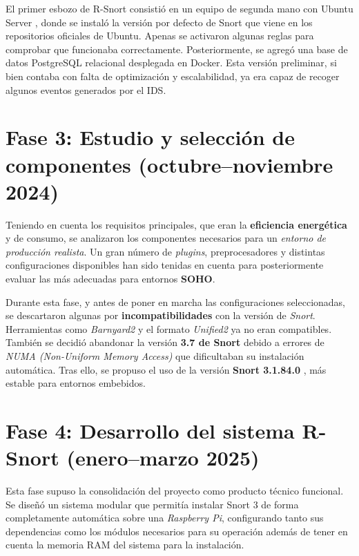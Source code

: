 \documentclass[11pt,a4paper,twoside]{report}
\begin{document}
El primer esbozo de R-Snort consistió en un equipo de segunda mano con Ubuntu Server \cite{insani2023implementation}, donde se instaló la versión por defecto de Snort que viene en los repositorios oficiales de Ubuntu. Apenas se activaron algunas reglas para comprobar que funcionaba correctamente. Posteriormente, se agregó una base de datos PostgreSQL relacional \cite{gkamas2022performance} desplegada en Docker. Esta versión preliminar, si bien contaba con falta de optimización y escalabilidad, ya era capaz de recoger algunos eventos generados por el IDS.

\section{Fase 3: Estudio y selección de componentes (octubre–noviembre 2024)}

Teniendo en cuenta los requisitos principales, que eran la \textbf{eficiencia energética} y de consumo, se analizaron los componentes necesarios para un \textit{entorno de producción realista}. Un gran número de \textit{plugins}, preprocesadores y distintas configuraciones disponibles han sido tenidas en cuenta para posteriormente evaluar las más adecuadas para entornos \textbf{SOHO}.\newline

Durante esta fase, y antes de poner en marcha las configuraciones seleccionadas, se descartaron algunas por \textbf{incompatibilidades} con la versión de \textit{Snort}. Herramientas como \textit{Barnyard2} \cite{o2015snort} y el formato \textit{Unified2} ya no eran compatibles. También se decidió abandonar la versión \textbf{3.7 de Snort} debido a errores de \textit{NUMA (Non-Uniform Memory Access)} que dificultaban su instalación automática. Tras ello, se propuso el uso de la versión \textbf{Snort 3.1.84.0} \cite{snort3_3184}, más estable para entornos embebidos.

\section{Fase 4: Desarrollo del sistema R-Snort (enero–marzo 2025)}

Esta fase supuso la consolidación del proyecto como producto técnico funcional. Se diseñó un sistema modular que permitía instalar Snort 3 de forma completamente automática sobre una \textit{Raspberry Pi}, configurando tanto sus dependencias como los módulos necesarios para su operación además de tener en cuenta la memoria RAM del sistema para la instalación.
\end{document}
